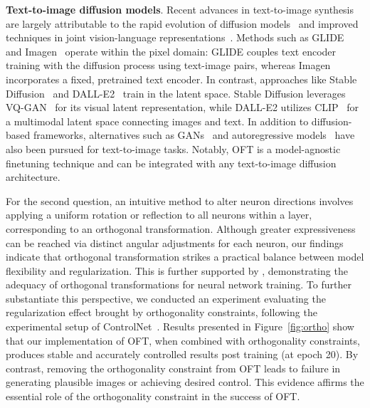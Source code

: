 \textbf{Text-to-image diffusion models}. Recent advances in text-to-image synthesis~\cite{saharia2022photorealistic,ramesh2022hierarchical,rombach2022high,gu2022vector,nichol2022glide} are largely attributable to the rapid evolution of diffusion models~\cite{ho2020denoising,song2021score,song2021denoising,dhariwal2021diffusion} and improved techniques in joint vision-language representations~\cite{su2020vlbert,lu2019vilbert,radford2021learning,wang2021simvlm,li2022blip,li2023blip,alayrac2022flamingo,schuhmann2022laion}. Methods such as GLIDE~\cite{nichol2022glide} and Imagen~\cite{saharia2022photorealistic} operate within the pixel domain: GLIDE couples text encoder training with the diffusion process using text-image pairs, whereas Imagen incorporates a fixed, pretrained text encoder. In contrast, approaches like Stable Diffusion~\cite{rombach2022high} and DALL-E2~\cite{ramesh2022hierarchical} train in the latent space. Stable Diffusion leverages VQ-GAN~\cite{esser2021taming} for its visual latent representation, while DALL-E2 utilizes CLIP~\cite{radford2021learning} for a multimodal latent space connecting images and text. In addition to diffusion-based frameworks, alternatives such as GANs~\cite{reed2016generative,zhang2017stackgan,xu2018attngan,li2019controllable} and autoregressive models~\cite{ramesh2021zero,ding2021cogview,wu2022nuwa,yuscaling} have also been pursued for text-to-image tasks. Notably, OFT is a model-agnostic finetuning technique and can be integrated with any text-to-image diffusion architecture.

For the second question, an intuitive method to alter neuron directions involves applying a uniform rotation or reflection to all neurons within a layer, corresponding to an orthogonal transformation. Although greater expressiveness can be reached via distinct angular adjustments for each neuron, our findings indicate that orthogonal transformation strikes a practical balance between model flexibility and regularization. This is further supported by \cite{liu2021orthogonal}, demonstrating the adequacy of orthogonal transformations for neural network training. To further substantiate this perspective, we conducted an experiment evaluating the regularization effect brought by orthogonality constraints, following the experimental setup of ControlNet~\cite{zhang2023adding}. Results presented in Figure~\ref{fig:ortho} show that our implementation of OFT, when combined with orthogonality constraints, produces stable and accurately controlled results post training (at epoch 20). By contrast, removing the orthogonality constraint from OFT leads to failure in generating plausible images or achieving desired control. This evidence affirms the essential role of the orthogonality constraint in the success of OFT.

